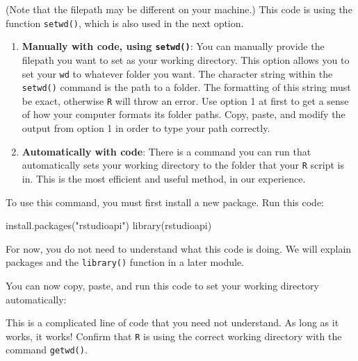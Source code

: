 \documentclass[
]{book}
\newenvironment{Shaded}{\begin{snugshade}}{\end{snugshade}}
\newcommand{\FunctionTok}[1]{\textcolor[rgb]{0.00,0.00,0.00}{#1}}
\newcommand{\NormalTok}[1]{#1}
\newcommand{\SpecialCharTok}[1]{\textcolor[rgb]{0.00,0.00,0.00}{#1}}
\newcommand{\StringTok}[1]{\textcolor[rgb]{0.31,0.60,0.02}{#1}}
\begin{document}
(Note that the filepath may be different on your machine.) This code is using the function \texttt{setwd()}, which is also used in the next option.

\begin{enumerate}
\def\labelenumi{\arabic{enumi}.}
\setcounter{enumi}{1}
\item
  \textbf{Manually with code, using \texttt{setwd()}}: You can manually provide the filepath you want to set as your working directory. This option allows you to set your \texttt{wd} to whatever folder you want. The character string within the \texttt{setwd()} command is the path to a folder. The formatting of this string must be exact, otherwise \texttt{R} will throw an error. Use option 1 at first to get a sense of how your computer formats its folder paths. Copy, paste, and modify the output from option 1 in order to type your path correctly.
\item
  \textbf{Automatically with code}: There is a command you can run that automatically sets your working directory to the folder that your \texttt{R} script is in. This is the most efficient and useful method, in our experience.
\end{enumerate}

To use this command, you must first install a new package. Run this code:

\begin{Shaded}
\begin{Highlighting}[]
\FunctionTok{install.packages}\NormalTok{(}\StringTok{"rstudioapi"}\NormalTok{)}
\FunctionTok{library}\NormalTok{(rstudioapi)}
\end{Highlighting}
\end{Shaded}

For now, you do not need to understand what this code is doing. We will explain packages and the \texttt{library()} function in a later module.

You can now copy, paste, and run this code to set your working directory automatically:

\begin{Shaded}
\end{Shaded}

This is a complicated line of code that you need not understand. As long as it works, it works! Confirm that \texttt{R} is using the correct working directory with the command \texttt{getwd()}.
\end{document}
